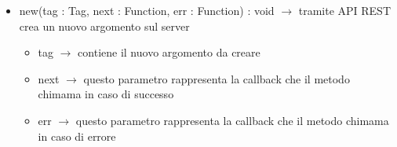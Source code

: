\begin{description}
\begin{itemize}
	\item new(tag : Tag, next : Function, err : Function) : void $\rightarrow$ tramite API REST crea un nuovo argomento sul server\begin{itemize}
		\item tag $\rightarrow$ contiene il nuovo argomento da creare
		\item next $\rightarrow$ questo parametro rappresenta la callback che il metodo chimama in caso di successo
		\item err $\rightarrow$ questo parametro rappresenta la callback che il metodo chimama in caso di errore
	\end{itemize}
	
\end{itemize}

\end{description}

